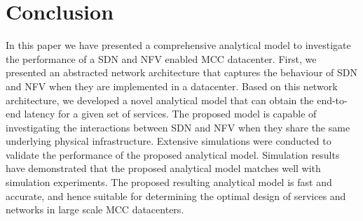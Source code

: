 
\section{Conclusion}
\label{sec:conclusions}

In this paper we have presented a comprehensive analytical model to investigate the performance of a SDN and NFV enabled MCC datacenter. First, we presented an abstracted  network architecture that captures the behaviour of SDN and NFV when they are implemented in a datacenter. Based on this network architecture, we developed a novel analytical model that can obtain the end-to-end latency for a given set of services. The proposed model is capable of investigating the interactions between SDN and NFV when they share the same underlying physical infrastructure. Extensive simulations were conducted to validate the performance of the proposed analytical model. Simulation results have demonstrated that the proposed analytical model matches well with simulation experiments. The proposed resulting analytical model is fast and accurate, and hence suitable for determining the optimal design of services and networks in large scale MCC datacenters.
